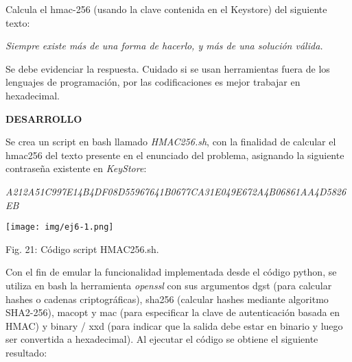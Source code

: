 \documentclass[12pt,oneside,a4paper]{book}
\begin{document}
\vspace{2em}

Calcula el hmac-256 (usando la clave contenida en el Keystore) del siguiente texto:

\vspace{1em}

\textit{Siempre existe más de una forma de hacerlo, y más de una solución válida.}

\vspace{1em}

Se debe evidenciar la respuesta. Cuidado si se usan herramientas fuera de los lenguajes de
programación, por las codificaciones es mejor trabajar en hexadecimal.

\vspace{2em}

\hspace{20pt} \textbf{DESARROLLO}

\vspace{1em}

\hspace{20pt}
Se crea un script en bash llamado \textit{HMAC256.sh}, con la finalidad de calcular el hmac256 del texto presente en el enunciado del problema, asignando la siguiente contraseña existente en \textit{KeyStore}:

\vspace{1em}

\begin{center}
    \textit{A212A51C997E14B4DF08D55967641B0677CA31E049E672A4B06861AA4D5826EB}
\end{center}

\vspace{2em}

\begin{center}
    \texttt{[image: img/ej6-1.png]}
    
\vspace{0.1em}
    
    Fig. 21: Código script HMAC256.sh.
\end{center}

\vspace{2em}

\hspace{20pt}
Con el fin de emular la funcionalidad implementada desde el código python, se utiliza en bash la herramienta \textit{openssl} con sus argumentos dgst (para calcular hashes o cadenas criptográficas), sha256 (calcular hashes mediante algoritmo SHA2-256), macopt y mac (para especificar la clave de autenticación basada en HMAC) y binary / xxd (para indicar que la salida debe estar en binario y luego ser convertida a hexadecimal). Al ejecutar el código se obtiene el siguiente resultado:
\end{document}

